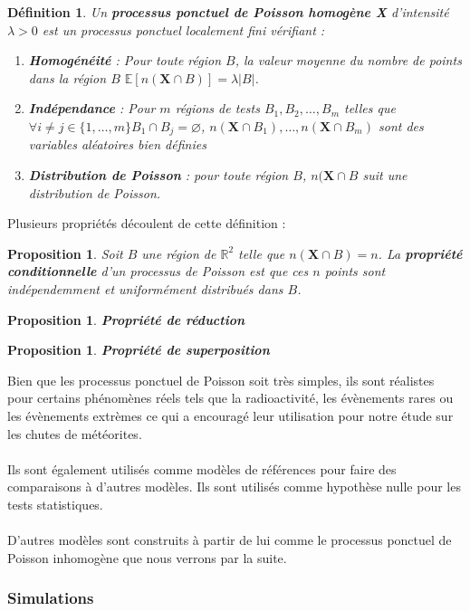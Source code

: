 \documentclass[12pt]{article}
\newcommand{\R}{\mathbb{R}}
\newtheorem{prop1}[thm1]{Proposition}
\newtheorem*{defin1}{Définition}
\begin{document}
\begin{defin1}
    Un \textbf{processus ponctuel de Poisson homogène X} d'intensité $\lambda > 0$ est un processus ponctuel localement fini vérifiant :
    \begin{enumerate}
        \item \textbf{Homogénéité} : Pour toute région $B$, la valeur moyenne du nombre de points dans la région $B$ $\mathbb{E}[n(\textbf{X}\cap B)] = \lambda|B|$.
        \item \textbf{Indépendance} : Pour $m$ régions de tests $B_1,B_2,\dots,B_m$ telles que $\forall i \neq j \in \{1,\dots,m\} B_1 \cap B_j = \varnothing $, $n(\textbf{X}\cap B_1),\dots,n(\textbf{X}\cap B_m)$ sont des variables aléatoires bien définies
        \item \textbf{Distribution de Poisson} : pour toute région $B$, $n(\textbf{X}\cap B$ suit une distribution de Poisson.
    \end{enumerate}
\end{defin1}

Plusieurs propriétés découlent de cette définition :
\begin{prop1}
Soit $B$ une région de $\R^2$ telle que $n(\textbf{X} \cap B) =n$. La \textbf{propriété conditionnelle} d'un processus de Poisson est que ces $n$ points sont indépendemment et uniformément distribués dans $B$.
\end{prop1}

\begin{prop1}
\textbf{Propriété de réduction}
\end{prop1}

\begin{prop1}
\textbf{Propriété de superposition}
\end{prop1}


Bien que les processus ponctuel de Poisson soit très simples, ils sont réalistes pour certains phénomènes réels tels que la radioactivité, les évènements rares ou les évènements extrèmes ce qui a encouragé leur utilisation pour notre étude sur les chutes de météorites.\\
\\
Ils sont également utilisés comme modèles de références pour faire des comparaisons à d'autres modèles. Ils sont utilisés comme hypothèse nulle pour les tests statistiques.\\
\\
D'autres modèles sont construits à partir de lui comme le processus ponctuel de Poisson inhomogène que nous verrons par la suite.
\subsubsection*{Simulations}
\end{document}
